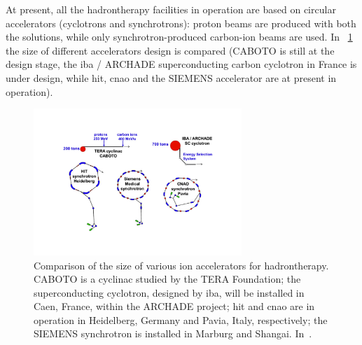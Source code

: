 At present, all the hadrontherapy facilities in operation are based on circular accelerators (cyclotrons and synchrotrons): proton beams are produced with both the solutions, while only synchrotron-produced carbon-ion beams are used. In \figurename~\ref{chap1::fig::acceleratorSize} the size of different accelerators design is compared (CABOTO is still at the design stage, the \gls{iba} / ARCHADE superconducting carbon cyclotron in France is under design, while \gls{hit}, \gls{cnao} and the SIEMENS accelerator are at present in operation).

\begin{figure}[!htbp]
\centering
\includegraphics[width=0.7\textwidth]{03_GraphicFiles/chapter1_Introduction/acceleratorSize.pdf}
\caption{Comparison of the size of various ion accelerators for hadrontherapy. CABOTO is a cyclinac studied by the TERA Foundation; the superconducting cyclotron, designed by \gls{iba}, will be installed in Caen, France, within the ARCHADE project; \gls{hit} and \gls{cnao} are in operation in Heidelberg, Germany and Pavia, Italy, respectively; the SIEMENS synchrotron is installed in Marburg and Shangai. In~\cite{Amaldi2010}.}
\label{chap1::fig::acceleratorSize}
\end{figure} 

